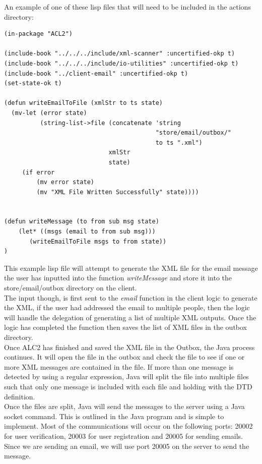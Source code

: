 \documentclass[11pt, letterpaper]{report}
\begin{document}
\begin{description}
An example of one of these lisp files that will need to be included in the actions directory: 
\begin{verbatim}
(in-package "ACL2")

(include-book "../../../include/xml-scanner" :uncertified-okp t)
(include-book "../../../include/io-utilities" :uncertified-okp t)
(include-book "../client-email" :uncertified-okp t)
(set-state-ok t)

(defun writeEmailToFile (xmlStr to ts state)
  (mv-let (error state)
          (string-list->file (concatenate 'string 
                                          "store/email/outbox/"
                                          to ts ".xml")
                             xmlStr
                             state)
     (if error
         (mv error state)
         (mv "XML File Written Successfully" state))))


(defun writeMessage (to from sub msg state)
	(let* ((msgs (email to from sub msg)))
       (writeEmailToFile msgs to from state))
)
\end{verbatim}
This example lisp file will attempt to generate the XML file for the email message the user has inputted into the function \textit{writeMessage} and store it into the store/email/outbox directory on the client. \\

The input though, is first sent to the \textit{email} function in the client logic to generate the XML, if the user had addressed the email to multiple people, then the logic will handle the delegation of generating a list of multiple XML outputs. Once the logic has completed the function then saves the list of XML files in the outbox directory. \\

Once ALC2 has finished and saved the XML file in the Outbox, the Java process continues. It will open the file in the outbox and check the file to see if one or more XML messages are contained in the file. If more than one message is detected by using a regular expression, Java will split the file into multiple files such that only one message is included with each file and holding with the DTD definition. \\

Once the files are split, Java will send the messages to the server using a Java socket command. This is outlined in the Java program and is simple to implement. Most of the communications will occur on the following ports: 20002 for user verification, 20003 for user registration and 20005 for sending emails. Since we are sending an email, we will use port 20005 on the server to send the message.\\


\end{description}
\end{document}
